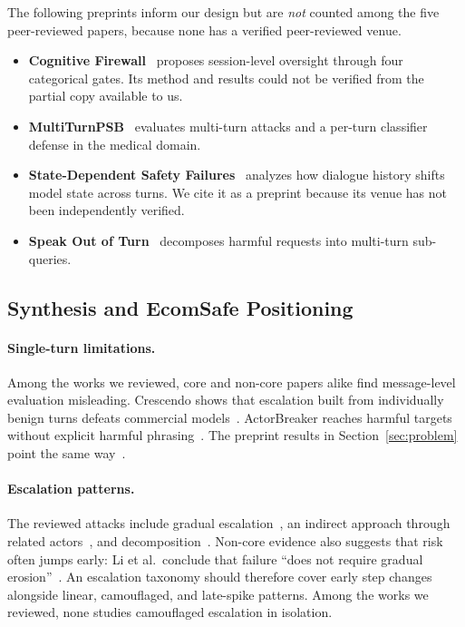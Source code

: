 \documentclass[sigconf,nonacm]{acmart}
\begin{document}
The following preprints inform our design but are \emph{not} counted among the five peer-reviewed papers, because none has a verified peer-reviewed venue.
\begin{itemize}
  \item \textbf{Cognitive Firewall}~\cite{guida2026cognitive} proposes session-level oversight through four categorical gates. Its method and results could not be verified from the partial copy available to us.
  \item \textbf{MultiTurnPSB}~\cite{sheoran2026multiturnpsb} evaluates multi-turn attacks and a per-turn classifier defense in the medical domain.
  \item \textbf{State-Dependent Safety Failures}~\cite{li2026state} analyzes how dialogue history shifts model state across turns. We cite it as a preprint because its venue has not been independently verified.
  \item \textbf{Speak Out of Turn}~\cite{zhou2024speak} decomposes harmful requests into multi-turn sub-queries.
\end{itemize}

\subsection{Synthesis and EcomSafe Positioning}
\label{sec:rw-synthesis}

\paragraph{Single-turn limitations.}
Among the works we reviewed, core and non-core papers alike find message-level evaluation misleading. Crescendo shows that escalation built from individually benign turns defeats commercial models~\cite{russinovich2025crescendo}. ActorBreaker reaches harmful targets without explicit harmful phrasing~\cite{ren2025llms}. The preprint results in Section~\ref{sec:problem} point the same way~\cite{sheoran2026multiturnpsb,li2026state}.

\paragraph{Escalation patterns.}
The reviewed attacks include gradual escalation~\cite{russinovich2025crescendo}, an indirect approach through related actors~\cite{ren2025llms}, and decomposition~\cite{zhou2024speak}. Non-core evidence also suggests that risk often jumps early: Li et al.\ conclude that failure ``does not require gradual erosion''~\cite{li2026state}. An escalation taxonomy should therefore cover early step changes alongside linear, camouflaged, and late-spike patterns. Among the works we reviewed, none studies camouflaged escalation in isolation.
\end{document}
